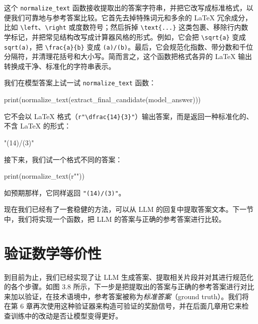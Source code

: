 这个 \texttt{normalize\_text} 函数接收提取出的答案字符串，并把它改写成标准格式，以便我们可靠地与参考答案比较。它首先去掉特殊词元和多余的 LaTeX 冗余成分，比如 \texttt{\textbackslash left}、\texttt{\textbackslash right} 或度数符号；然后拆掉 \texttt{\textbackslash text\{...\}} 这类包裹、移除行内数学标记，并把常见结构改写成计算器风格的形式。例如，它会把 \texttt{\textbackslash sqrt\{a\}} 变成 \texttt{sqrt(a)}，把 \texttt{\textbackslash frac\{a\}\{b\}} 变成 \texttt{(a)/(b)}。最后，它会规范化指数、带分数和千位分隔符，并清理花括号和大小写。简而言之，这个函数把格式各异的 LaTeX 输出转换成干净、标准化的字符串表示。

我们在模型答案上试一试 \texttt{normalize\_text} 函数：

\begin{codebox}
print(normalize_text(extract_final_candidate(model_answer)))
\end{codebox}

它不会以 LaTeX 格式（\texttt{r}\texttt{"}\texttt{\textbackslash dfrac\{14\}\{3\}}\texttt{"}）输出答案，而是返回一种标准化的、不含 LaTeX 的形式：

\begin{codebox}
"(14)/(3)"
\end{codebox}

接下来，我们试一个格式不同的答案：

\begin{codebox}
print(normalize_text(r"\text{\[\frac{14}{3}\]}"))
\end{codebox}

如预期那样，它同样返回 \texttt{"}\texttt{(14)/(3)}\texttt{"}。

现在我们已经有了一套稳健的方法，可以从 LLM 的回复中提取答案文本。下一节中，我们将实现一个函数，把 LLM 的答案与正确的参考答案进行比较。

\section{验证数学等价性}

到目前为止，我们已经实现了让 LLM 生成答案、提取相关片段并对其进行规范化的各个步骤。如图 3.8 所示，下一步是把提取出的答案与正确的参考答案进行对比来加以验证，在技术语境中，参考答案被称为\emph{标准答案}（ground truth）。我们将在第 6 章再次使用这种验证器来构造可验证的奖励信号，并在后面几章用它来检查训练中的改动是否让模型变得更好。


